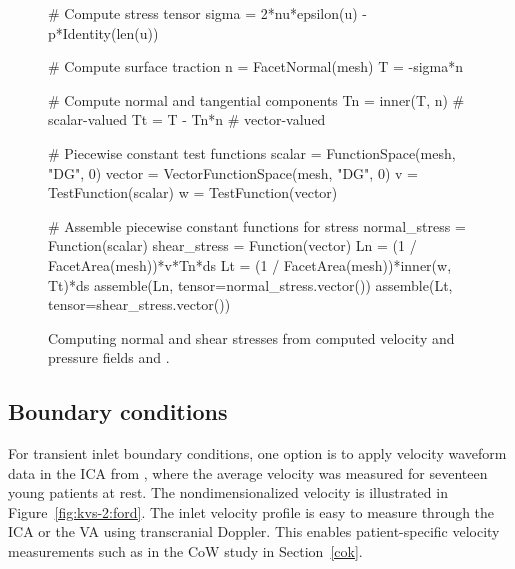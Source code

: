 
\begin{figure}
  \begin{center} \label{fig:kvs-2:stress_code}
    \begin{python}
# Compute stress tensor
sigma = 2*nu*epsilon(u) - p*Identity(len(u))

# Compute surface traction
n = FacetNormal(mesh)
T = -sigma*n

# Compute normal and tangential components
Tn = inner(T, n) # scalar-valued
Tt = T - Tn*n    # vector-valued

# Piecewise constant test functions
scalar = FunctionSpace(mesh, "DG", 0)
vector = VectorFunctionSpace(mesh, "DG", 0)
v = TestFunction(scalar)
w = TestFunction(vector)

# Assemble piecewise constant functions for stress
normal_stress = Function(scalar)
shear_stress = Function(vector)
Ln = (1 / FacetArea(mesh))*v*Tn*ds
Lt = (1 / FacetArea(mesh))*inner(w, Tt)*ds
assemble(Ln, tensor=normal_stress.vector())
assemble(Lt, tensor=shear_stress.vector())
    \end{python}
  \end{center}
    \caption{Computing normal and shear stresses from computed
      velocity and pressure fields  and .}
\end{figure}

\subsection{Boundary conditions} \label{resistance_bcs}

For transient inlet boundary conditions, one option is to apply
velocity waveform data in the ICA
from \citet{FordAlperinLeeEtAl2005}, where the average velocity was
measured for seventeen young patients at rest. The nondimensionalized
velocity is illustrated in Figure~\ref{fig:kvs-2:ford}. The inlet
velocity profile is easy to measure through the ICA or the
VA using transcranial Doppler. This enables
patient-specific velocity measurements such as in the CoW study in
Section~\ref{cok}.



